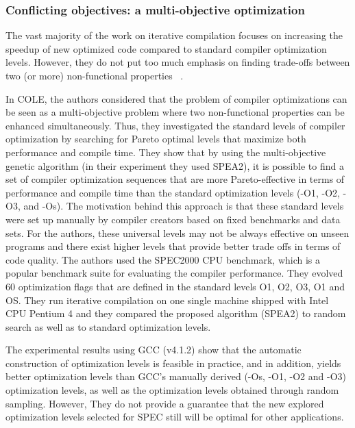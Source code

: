 \subsubsection{Conflicting objectives: a multi-objective optimization}
The vast majority of the work on iterative compilation focuses on increasing the speedup of new optimized code compared to standard compiler optimization levels. However, they do not put too much emphasis on finding trade-offs between two (or more) non-functional properties ~\cite{almagor2004finding,hoste2008cole,pan2006fast,pallister2015identifying,chen2012deconstructing,martins2014exploration,lin2008automatic,martinez2014multi}.

In COLE\cite{hoste2008cole}, the authors considered that the problem of compiler optimizations can be seen as a multi-objective problem where two non-functional properties can be enhanced simultaneously. Thus, they investigated the standard levels of compiler optimization by searching for Pareto optimal levels that maximize both performance and compile time. 
They show that by using the multi-objective genetic algorithm (in their experiment they used SPEA2), it is possible to find a set of compiler optimization sequences that are more Pareto-effective in terms of performance and compile time than the standard optimization levels (-O1, -O2, -O3, and -Os). The motivation behind this approach is that these standard levels were set up manually by compiler creators based on fixed benchmarks and data sets. For the authors, these universal levels may not be always effective on unseen programs and there exist higher levels that provide better trade offs in terms of code quality.
The authors used the SPEC2000 CPU benchmark, which is a popular benchmark suite for evaluating the compiler performance. They evolved 60 optimization flags that are defined in the standard levels O1, O2, O3, O1 and OS. They run iterative compilation on one single machine shipped with Intel CPU Pentium 4 and they compared the proposed algorithm (SPEA2) to random search as well as to standard optimization levels.

The experimental results using GCC (v4.1.2) show that the automatic construction of optimization levels is feasible in practice, and in addition, yields better optimization levels than GCC’s manually derived (-Os, -O1, -O2 and -O3) optimization levels, as well as the optimization levels obtained through random sampling.
However, They do not provide a guarantee that the new explored optimization levels selected for SPEC still will be optimal for other applications.


